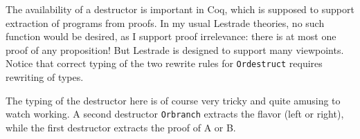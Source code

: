 \documentclass[12pt]{article}
\begin{document}
The availability of a destructor is important in Coq, which is supposed to support extraction of programs from proofs.  In my usual Lestrade theories, no such function would be desired, as
I support proof irrelevance:  there is at most one proof of any proposition!  But Lestrade is designed to support many viewpoints.  Notice that correct typing of the two rewrite rules
for {\tt Ordestruct} requires rewriting of types.

The typing of the destructor here is of course very tricky and quite amusing to watch working.  A second destructor {\tt Orbranch} extracts the flavor (left or right), while the first destructor extracts the proof of A or B.
\end{document}

